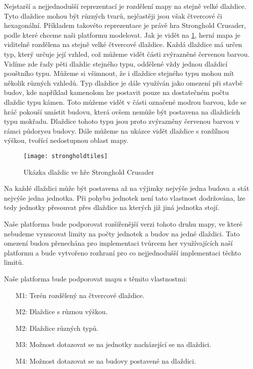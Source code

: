 Nejstarší a nejjednodušší reprezentací je rozdělení mapy na stejně velké dlaždice. Tyto dlaždice mohou být různých tvarů, nejčastěji jsou však čtvercové či hexagonální. Příkladem takovéto reprezentace je právě hra Stronghold Crusader, podle které chceme naši platformu modelovat. Jak je vidět na \ref{fig:tiletype}, herní mapa je viditelně rozdělena na stejně velké čtvercové dlaždice. Každá dlaždice má určen typ, který určuje její vzhled, což můžeme vidět části zvýrazněné červenou barvou. Vidíme zde řady pěti dlaždic stejného typu, oddělené vždy jednou dlaždicí pouštního typu. Můžeme si všimnout, že i dlaždice stejného typu mohou mít několik různých vzhledů. Typ dlaždice je dále využíván jako omezení při stavbě budov, kde například kamenolom lze postavit pouze na dostatečném počtu dlaždic typu kámen. Toto můžeme vidět v části označené modrou barvou, kde se hráč pokouší umístit budovu, která ovšem nemůže být postavena na dlaždicích typu mokřadu. Dlaždice tohoto typu jsou proto zvýrazněny červenou barvou v rámci půdorysu budovy. Dále můžeme na ukázce vidět dlaždice s rozdílnou výškou, tvořící nedostupnou oblast mapy.

\begin{figure}[h]
	\centering
	\texttt{[image: strongholdtiles]}
	\caption{Ukázka dlaždic ve hře Stronghold Crusader}
	\label{fig:tiletype}
\end{figure}

Na každé dlaždici může být postavena až na výjimky nejvýše jedna budova a stát nejvýše jedna jednotka. Při pohybu jednotek není tato vlastnost dodržována, lze tedy jednotky přesouvat přes dlaždice na kterých již jiná jednotka stojí. 

Naše platforma bude podporovat rozšířenější verzi tohoto druhu mapy, ve které nebudeme vynucovat limity na počty jednotek a budov na jedné dlaždici. Tato omezení budou přenechána pro implementaci tvůrcem her využívajících naší platformu a bude vytvořeno rozhraní pro co nejjednodušší implementaci těchto limitů. 


Naše platforma bude podporovat mapu s těmito vlastnostmi:
\begin{itemize}
	\item[M1:] Terén rozdělený na čtvercové dlaždice.
	\item[M2:] Dlaždice s různou výškou.
	\item[M2:] Dlaždice různých typů.
	\item[M3:] Možnost dotazovat se na jednotky nacházející se na dlaždici.
	\item[M4:] Možnost dotazovat se na budovy postavené na dlaždici.
\end{itemize}
